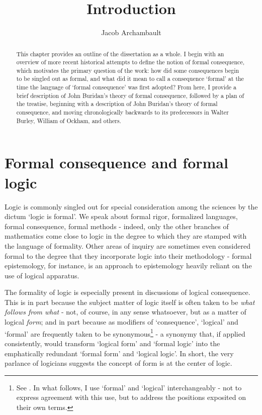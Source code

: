 \documentclass[]{article}
\title{Introduction}
\author{Jacob Archambault}
\begin{document}
\maketitle

\begin{abstract}
This chapter provides an outline of the dissertation as a whole. I begin with an overview of more recent historical attempts to define the notion of formal consequence, which motivates the primary question of the work: how did some consequences begin to be singled out as formal, and what did it mean to call a consequence `formal' at the time the language of `formal consequence' was first adopted? From here, I provide a brief description of John Buridan's theory of formal consequence, followed by a plan of the treatise, beginning with a description of John Buridan's theory of formal consequence, and moving chronologically backwards to its predecessors in Walter Burley, William of Ockham, and others.
\end{abstract}

\section{Formal consequence and formal logic}
Logic is commonly singled out for special consideration among the sciences by the dictum `logic is formal'. We speak about formal rigor, formalized languages, formal consequence, formal methods - indeed, only the other branches of mathematics come close to logic in the degree to which they are stamped with the language of formality. Other areas of inquiry are sometimes even considered formal to the degree that they incorporate logic into their methodology - formal epistemology, for instance, is an approach to epistemology heavily reliant on the use of logical apparatus.

The formality of logic is especially present in discussions of logical consequence. This is in part because the subject matter of logic itself is often taken to be \textit{what follows from what} - not, of course, in any sense whatsoever, but as a matter of logical \textit{form}; and in part because as modifiers of `consequence', `logical' and `formal' are frequently taken to be synonymous\footnote{See \cite[188, 193]{Tarski2002}. In what follows, I use `formal' and `logical' interchangeably - not to express agreement with this use, but to address the positions exposited on their own terms.} - a synonymy that, if applied consistently, would transform `logical form' and `formal logic' into the emphatically redundant `formal form' and `logical logic'. In short, the very parlance of logicians suggests the concept of form is at the center of logic.
\end{document}
